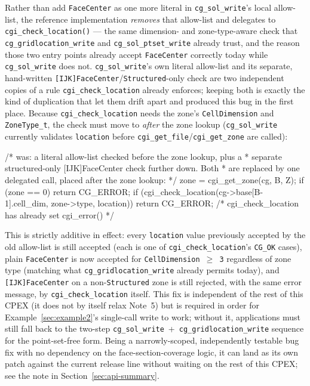 \documentclass[11pt,letterpaper]{article}
\makeatletter
\let\cgns@orig@lstlisting\lstlisting
\let\cgns@endorig@lstlisting\endlstlisting
\renewenvironment{lstlisting}
  {\par\needspace{5\baselineskip}\nolinenumbers\cgns@orig@lstlisting}
  {\cgns@endorig@lstlisting\par\linenumbers}
\makeatother
\begin{document}
Rather than add \texttt{FaceCenter} as one more literal in
\texttt{cg\_sol\_write}'s local allow-list, the reference implementation
\emph{removes} that allow-list and delegates to
\texttt{cgi\_check\_location()} --- the same dimension- and zone-type-aware
check that \texttt{cg\_gridlocation\_write} and \texttt{cg\_sol\_ptset\_write}
already trust, and the reason those two entry points already accept
\texttt{FaceCenter} correctly today while \texttt{cg\_sol\_write} does not.
\texttt{cg\_sol\_write}'s own literal allow-list and its separate,
hand-written \texttt{[IJK]FaceCenter}/\texttt{Structured}-only check
are two independent copies of a rule \texttt{cgi\_check\_location} already
enforces; keeping both is exactly the kind of duplication that let them
drift apart and produced this bug in the first place. Because
\texttt{cgi\_check\_location} needs the zone's \texttt{CellDimension} and
\texttt{ZoneType\_t}, the check must move to \emph{after} the zone lookup
(\texttt{cg\_sol\_write} currently validates \texttt{location} before
\texttt{cgi\_get\_file}/\texttt{cgi\_get\_zone} are called):

\begin{lstlisting}[language=C]
/* was: a literal allow-list checked before the zone lookup, plus a
 * separate structured-only [IJK]FaceCenter check further down. Both
 * are replaced by one delegated call, placed after the zone lookup: */
zone = cgi_get_zone(cg, B, Z);
if (zone == 0) return CG_ERROR;
if (cgi_check_location(cg->base[B-1].cell_dim, zone->type, location))
    return CG_ERROR;   /* cgi_check_location has already set cgi_error() */
\end{lstlisting}

This is strictly additive in effect: every \texttt{location} value
previously accepted by the old allow-list is still accepted (each is one
of \texttt{cgi\_check\_location}'s \texttt{CG\_OK} cases), plain
\texttt{FaceCenter} is now accepted for \texttt{CellDimension~$\geq$~3}
regardless of zone type (matching what \texttt{cg\_gridlocation\_write}
already permits today), and \texttt{[IJK]FaceCenter} on a non-\texttt{Structured}
zone is still rejected, with the same error message, by
\texttt{cgi\_check\_location} itself. This fix is independent of the rest
of this CPEX (it does not by itself relax Note~5) but is required in order
for Example~\ref{sec:example2}'s single-call write to work; without it,
applications must still fall back to the two-step
\texttt{cg\_sol\_write}~+~\texttt{cg\_gridlocation\_write} sequence for the
point-set-free form. Being a narrowly-scoped, independently testable bug
fix with no dependency on the face-section-coverage logic, it can land as its own
patch against the current release line without waiting on the rest of
this CPEX; see the note in Section~\ref{sec:api-summary}.
\end{document}

